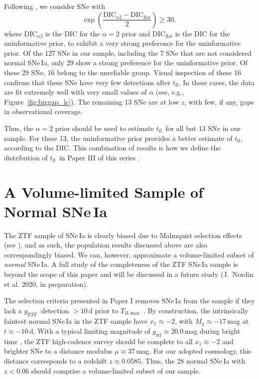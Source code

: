 \documentclass[twocolumn]{./aastex63}
\newcommand{\gztf}{$g_\mathrm{ZTF}$}
\newcommand{\tfl}{$t_\mathrm{fl}$}
\newcommand{\tbmax}{$T_{B,\mathrm{max}}$}
\begin{document}
Following \citet{Jeffreys61}, we consider SNe with
%
$$\exp\left(\frac{\mathrm{DIC}_{\alpha2} - \mathrm{DIC}_\mathrm{flat}}{2}\right) \ge 30,$$
%
where $\mathrm{DIC}_{\alpha2}$ is the DIC for the $\alpha = 2$ prior and
$\mathrm{DIC}_\mathrm{flat}$ is the DIC for the uninformative prior, to
exhibit a very strong preference for the uninformative prior. Of the 127 SNe
in our sample, including the 7 SNe that are not considered normal SNe\,Ia,
only 29 show a strong preference for the uninformative prior. Of these 29 SNe,
16 belong to the unreliable group. Visual inspection of these 16 confirms that
these SNe have very few detections after \tfl. In these cases, the data are
fit extremely well with very small values of $\alpha$ (see, e.g.,
Figure~\ref{fig:biggap_lc}). The remaining 13 SNe are at low $z$, with few, if
any, gaps in observational coverage.

Thus, the $\alpha = 2$ prior should be used to estimate \tfl\ for all but 13
SNe in our sample. For these 13, the uninformative prior provides a better
estimate of \tfl, according to the DIC. This combination of results is how we
define the distribution of \tfl\ in Paper III of this series \citep{Bulla20}.

\section{A Volume-limited Sample of Normal SNe\,Ia}\label{sec:volume_limited}

The ZTF sample of SNe\,Ia is clearly biased due to Malmquist selection effects
(see \citealt{Yao19}), and as such, the population results discussed above are
also correspondingly biased. We can, however, approximate a volume-limited
subset of \textit{normal} SNe\,Ia. A full study of the completeness of the ZTF
SNe\,Ia sample is beyond the scope of this paper and will be discussed in a
future study (J.~Nordin et al. 2020, in preparation).

The selection criteria presented in Paper I removes SNe\,Ia from the sample if
they lack a \gztf\ detection $> 10$\,d prior to \tbmax\ \citep{Yao19}. By
construction, the intrinsically faintest normal SNe\,Ia in the ZTF sample have
$x_1 \approx -2$, with $M_g \approx -17$\,mag at $t \approx -10$\,d. With a
typical limiting magnitude of $g_\mathrm{ztf} \approx 20.0$\,mag during bright
time \citep{Bellm19}, the ZTF high-cadence survey should be complete to all
$x_1 \approx -2$ and brighter SNe to a distance modulus $\mu \approx 37$\,mag.
For our adopted cosmology, this distance corresponds to a redshift $z \approx
0.0585$. Thus, the 28 normal SNe\,Ia with $z < 0.06$ should comprise a
volume-limited subset of our sample.
\end{document}
